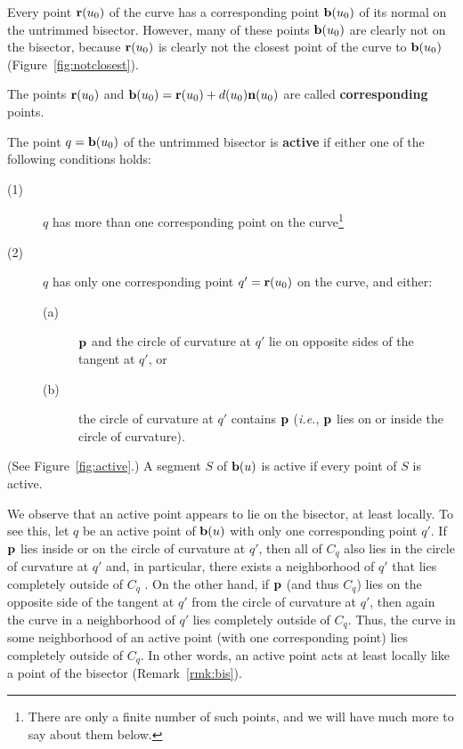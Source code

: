 Every point ${\bf r}(u_0)$ of the curve has a corresponding point 
${\bf b}(u_0)$ of its normal on the untrimmed bisector.
However, many of these points ${\bf b}(u_0)$ are clearly not on the bisector,
because ${\bf r}(u_0)$ is clearly not the closest point of the curve to 
${\bf b}(u_0)$ (Figure~\ref{fig:notclosest}).


\begin{dfn}
The points ${\bf r}(u_0)$ and 
${\bf b}(u_0) = {\bf r}(u_0) + d(u_0){\bf n}(u_0)$ are called
{\bf corresponding} points.
\end{dfn}

\begin{dfn}
The point $q = {\bf b}(u_{0})$ of the untrimmed bisector
is {\bf active} if either one of the following conditions holds:
\begin{description}
\item[(1)]
	$q$ has more than one corresponding point on the curve\footnote{There
		are only a finite number of such points, and we will have
		much more to say about them below.}
\item[(2)]
	$q$ has only one corresponding point $q' = {\bf r}(u_0)$ on the curve,
	and either:
\begin{description}
\item[(a)]
	${\bf p}$ and the circle of curvature at $q'$
	lie on opposite sides of the tangent at $q'$, or
\item[(b)]
	the circle of curvature at $q'$ contains ${\bf p}$
	({\em i.e.}, ${\bf p}$ lies on or inside the circle of curvature).
\end{description}
\end{description}
(See Figure~\ref{fig:active}.)
A segment $S$ of ${\bf b}(u)$ is active if every point of $S$ is active.
\end{dfn}


\begin{rmk}
\label{r:active}
We observe that an active point appears to lie on the bisector,
at least locally.
To see this, 
let $q$ be an active point of ${\bf b}(u)$ with only one corresponding
point $q'$.
If ${\bf p}$ lies inside or on the circle of curvature at $q'$,
then all of $C_q$ also lies in the circle of curvature at $q'$ 
and, in particular, there exists a neighborhood of $q'$ 
that lies completely outside of $C_q$ \cite[p. 176]{H52}.
On the other hand, if ${\bf p}$ (and thus $C_q$) lies on the opposite side 
of the tangent at $q'$ from the circle of curvature at $q'$,
then again the curve in a neighborhood of $q'$ lies completely outside of
$C_q$.
Thus, the curve in some neighborhood of an active point (with one corresponding
point) lies completely outside of $C_q$.
In other words, an active point acts at least locally
like a point of the bisector (Remark~\ref{rmk:bis}).
\end{rmk}

